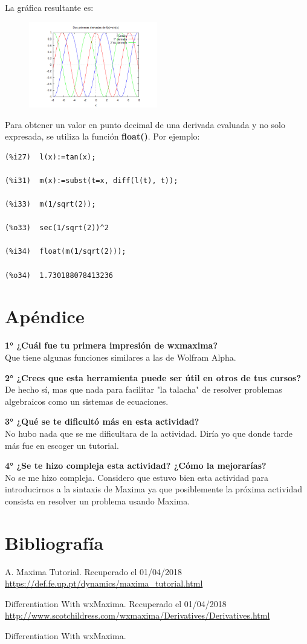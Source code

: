 \documentclass[a4paper]{article}
\begin{document}
La gráfica resultante es:

\begin{figure}[ht!]
\centering
\includegraphics[width=0.5\textwidth]{grafica2derivadas.png}
\end{figure}

\newpage

Para obtener un valor en punto decimal de una derivada evaluada y no solo expresada, se utiliza la función \textbf{float()}. Por ejemplo:

\begin{verbatim}
(%i27)	l(x):=tan(x);

(%i31)	m(x):=subst(t=x, diff(l(t), t));

(%i33)	m(1/sqrt(2));

(%o33)	sec(1/sqrt(2))^2

(%i34)	float(m(1/sqrt(2)));

(%o34)	1.730188078413236
\end{verbatim}






\section{Apéndice}

\textbf{1° ¿Cuál fue tu primera impresión de wxmaxima?}\\

Que tiene algunas funciones similares a las de Wolfram Alpha.

\textbf{2° ¿Crees que esta herramienta puede ser útil en otros de tus cursos?}\\
De hecho sí, mas que nada para facilitar "la talacha" de resolver problemas algebraicos como un sistemas de ecuaciones.

\textbf{3° ¿Qué se te dificultó más en esta actividad?}\\
No hubo nada que se me dificultara de la actividad. Diría yo que donde tarde más fue en escoger un tutorial. 

\textbf{4° ¿Se te hizo compleja esta actividad? ¿Cómo la mejorarías?}\\
No se me hizo compleja. Considero que estuvo bien esta actividad para introducirnos a la sintaxis de Maxima ya que posiblemente la próxima actividad consista en resolver un problema usando Maxima. 


\section{Bibliografía}

A. Maxima Tutorial. Recuperado el 01/04/2018
\url{https://def.fe.up.pt/dynamics/maxima_tutorial.html}

Differentiation With wxMaxima. Recuperado el 01/04/2018
\url{http://www.scotchildress.com/wxmaxima/Derivatives/Derivatives.html}

Differentiation With wxMaxima. 
\end{document}
